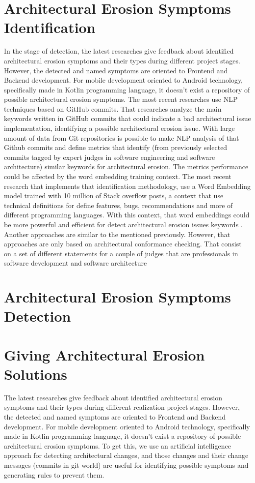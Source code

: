 \section{Architectural Erosion Symptoms Identification}
In the stage of detection, the latest researches give feedback about identified architectural erosion symptoms and their types during different project stages. However, the detected and named symptoms are oriented to Frontend and Backend development. For mobile development oriented to Android technology, specifically made in Kotlin programming language, it doesn't exist a repository of possible architectural erosion symptoms. The most recent researches use NLP techniques based on GitHub commits. That researches analyze the main keywords written in GitHub commits that could indicate a bad architectural issue implementation, identifying a possible architectural erosion issue.
With large amount of data from Git repositories is possible to make NLP analysis of that Github commits and define metrics that identify (from previously selected commits tagged by expert judges in software engineering and software architecture) similar keywords for architectural erosion. The metrics performance could be affected by the word embedding training context. The most recent research that implements that identification methodology, use a Word Embedding model trained with 10 million of Stack overflow posts, a context that use technical definitions for define features, bugs, recommendations and more of different programming languages. With this context, that word embeddings could be more powerful and efficient for detect architectural erosion issues keywords \cite{warnings-architectural-erosion,so-word-embedding}.
Another approaches are similar to the mentioned previously. However, that approaches are only based on architectural conformance checking. That consist on a set of different statements for a couple of judges that are professionals in software development and software architecture

\section{Architectural Erosion Symptoms Detection}


\section{Giving Architectural Erosion Solutions}
The latest researches give feedback about identified architectural erosion symptoms and their types during different realization project stages. However, the detected and named symptoms are oriented to Frontend and Backend development. For mobile development oriented to Android technology, specifically made in Kotlin programming language, it doesn't exist a repository of possible architectural erosion symptoms. To get this, we use an artificial intelligence approach for detecting architectural changes, and those changes and their change messages (commits in git world) are useful for identifying possible symptoms and generating rules to prevent them.
